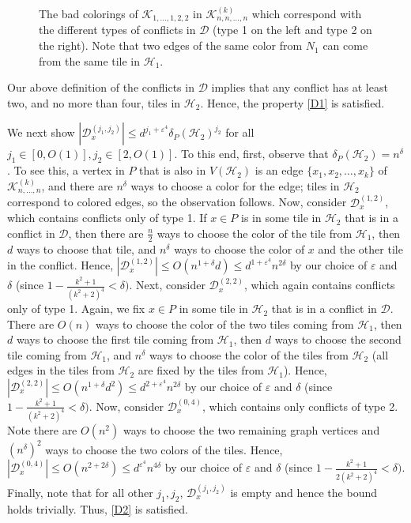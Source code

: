 \documentclass{article}
\theoremstyle{definition}
\newcommand\cH{{\mathcal H}}
\newcommand{\cD}{\mathcal{D}}
\newcommand\cK{{\mathcal K}}
\begin{document}
    \begin{figure}[h!]
        \centering

    
        \caption{The bad colorings of $\cK_{1, \dots, 1, 2, 2}$ in $\cK_{n,n,...,n}^{(k)}$ which correspond with the different types of conflicts in $\mathcal{D}$ (type 1 on the left and type 2 on the right). Note that two edges of the same color from $N_1$ can come from the same tile in $\cH_1$.}
        \label{fig:bad_config2}
    \end{figure}

    Our above definition of the conflicts in $\cD$ implies that any conflict has at least two, and no more than four, tiles in $\cH_2$.  Hence, the property \ref{D1} is satisfied.  

    We next show $\left| \cD_x^{(j_1,j_2)} \right| \leq d^{j_1 + \varepsilon^4} \delta_P(\cH_2)^{j_2}$ for all $j_1 \in [0,O(1)], j_2 \in [2,O(1)]$.  To this end, first, observe that $\delta_P(\cH_2) = n^\delta$.  To see this, a vertex in $P$ that is also in $V(\cH_2)$ is an edge $\{x_1, x_2, \dots, x_k\}$ of $\cK_{n,\dots,n}^{(k)}$, and there are $n^\delta$ ways to choose a color for the edge; tiles in $\cH_2$ correspond to colored edges, so the observation follows.  Now, consider $\cD_x^{(1,2)}$, which contains conflicts only of type 1.  If $x \in P$ is in some tile in $\cH_2$ that is in a conflict in $\cD$, then there are $\frac{n}{2}$ ways to choose the color of the tile from $\cH_1$, then $d$ ways to choose that tile, and $n^\delta$ ways to choose the color of $x$ and the other tile in the conflict.  Hence, $\left| \cD_x^{(1,2)} \right| \leq O(n^{1+\delta} d) \leq d^{1+\varepsilon^4} n^{2\delta}$ by our choice of $\varepsilon$ and $\delta$ (since $1 - \frac{k^2 + 1}{(k^2 + 2)^4} < \delta)$.  Next, consider $\cD_x^{(2,2)}$, which again contains conflicts only of type 1.  Again, we fix $x \in P$ in some tile in $\cH_2$ that is in a conflict in $\cD$.  There are $O(n)$ ways to choose the color of the two tiles coming from $\cH_1$, then $d$ ways to choose the first tile coming from $\cH_1$, then $d$ ways to choose the second tile coming from $\cH_1$, and $n^\delta$ ways to choose the color of the tiles from $\cH_2$ (all edges in the tiles from $\cH_2$ are fixed by the tiles from $\cH_1$).  Hence, $\left| \cD_x^{(2,2)} \right| \leq O(n^{1+\delta} d^2) \leq d^{2+\varepsilon^4} n^{2\delta}$ by our choice of $\varepsilon$ and $\delta$ (since $1 - \frac{k^2 + 1}{(k^2 + 2)^4} < \delta)$.  Now, consider $\cD_x^{(0,4)}$, which contains only conflicts of type 2.  Note there are $O(n^2)$ ways to choose the two remaining graph vertices and $(n^{\delta})^2$ ways to choose the two colors of the tiles.  Hence, $\left| \cD_x^{(0,4)} \right| \leq O(n^{2 + 2\delta}) \leq d^{\varepsilon^4} n^{4\delta}$ by our choice of $\varepsilon$ and $\delta$ (since $1 - \frac{k^2 + 1}{2(k^2 + 2)^4} < \delta)$.  Finally, note that for all other $j_1, j_2$, $\cD_x^{(j_1,j_2)}$ is empty and hence the bound holds trivially.  Thus, \ref{D2} is satisfied.  
\end{document}
